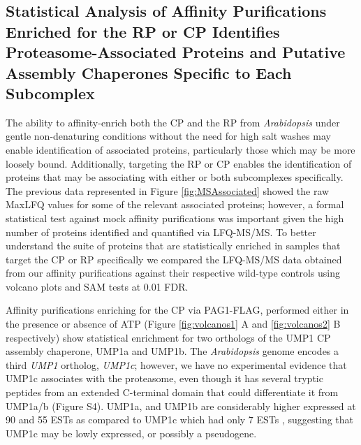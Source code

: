 \subsection{Statistical Analysis of Affinity Purifications Enriched for the RP or CP Identifies Proteasome-Associated Proteins and Putative Assembly Chaperones Specific to Each Subcomplex}
	The ability to affinity-enrich both the CP and the RP from \textit{Arabidopsis} under gentle non-denaturing conditions without the need for high salt washes may enable identification of associated proteins, particularly those which may be more loosely bound. Additionally, targeting the RP or CP enables the identification of proteins that may be associating with either or both subcomplexes specifically. The previous data represented in Figure \ref{fig:MSAssociated} showed the raw MaxLFQ values for some of the relevant associated proteins; however, a formal statistical test against mock affinity purifications was important given the high number of proteins identified and quantified via LFQ-MS/MS. To better understand the suite of proteins that are statistically enriched in samples that target the CP or RP specifically we compared the LFQ-MS/MS data obtained from our affinity purifications against their respective wild-type controls using volcano plots and SAM tests at 0.01 FDR.
	
Affinity purifications enriching for the CP via PAG1-FLAG, performed either in the presence or absence of ATP (Figure \ref{fig:volcanos1} A and  \ref{fig:volcanos2} B respectively) show statistical enrichment for two orthologs of the UMP1 CP assembly chaperone, UMP1a and UMP1b. The \textit{Arabidopsis} genome encodes a third \textit{UMP1} ortholog, \textit{UMP1c}; however, we have no experimental evidence that UMP1c associates with the proteasome, even though it has several tryptic peptides from an extended C-terminal domain that could differentiate it from UMP1a/b (Figure S4). UMP1a, and UMP1b are considerably higher expressed at 90 and 55 ESTs as compared to UMP1c which had only 7 ESTs \citep{berardini15}, suggesting that UMP1c may be lowly expressed, or possibly a pseudogene. 

